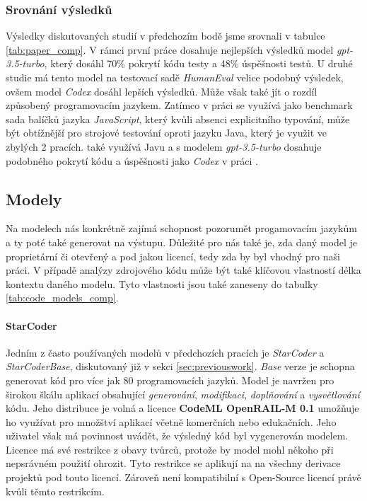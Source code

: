 \documentclass[czech, ma, kiv, he, iso690alph, pdf, viewonly]{fasthesis}
\begin{document}
    \subsubsection{Srovnání výsledků}
    Výsledky diskutovaných studií v předchozím bodě jsme srovnali v tabulce \ref{tab:paper_comp}. V rámci první práce dosahuje nejlepších výsledků model \textit{gpt-3.5-turbo}, který dosáhl 70\% pokrytí kódu testy a 48\% úspěšnosti testů. U druhé studie má tento model na testovací sadě \textit{HumanEval} velice podobný výsledek, ovšem model \textit{Codex} dosáhl lepších výsledků. Může však také jít o rozdíl způsobený programovacím jazykem. Zatímco v práci \cite{schafer2023empirical} se využívá jako benchmark sada balíčků jazyka \textit{JavaScript}, který kvůli absenci explicitního typování, může být obtížnější pro strojové testování oproti jazyku Java, který je využit ve zbylých 2 pracích. \cite{jutai} také využívá Javu a s modelem \textit{gpt-3.5-turbo} dosahuje podobného pokrytí kódu a úspěšnosti jako \textit{Codex} v práci \cite{siddiq2023exploring}.


    \subsection{Modely} \label{sec:research_models}
    Na  modelech nás konkrétně zajímá schopnost pozorumět progamovacím jazykům a ty poté také generovat na výstupu. Důležité pro nás také je, zda daný model je proprietární či otevřený a pod jakou licencí, tedy zda by byl vhodný pro naši práci. V případě analýzy zdrojového kódu může být také klíčovou vlastností délka kontextu daného modelu. Tyto vlastnosti jsou také zaneseny do tabulky \ref{tab:code_models_comp}.

    \paragraph{StarCoder} Jedním z často používaných modelů v předchozích pracích je \textit{StarCoder} a \textit{StarCoderBase}, diskutovaný již v sekci \ref{sec:previouswork}. \textit{Base} verze je schopna generovat kód pro více jak 80 programovacích jazyků. Model je navržen pro širokou škálu aplikací obsahující \textit{generování}, \textit{modifikaci}, \textit{doplňování} a \textit{vysvětlování} kódu. Jeho distribuce je volná a licence \textbf{CodeML OpenRAIL-M 0.1} \cite{BigCode2023} umožňuje ho využívat pro množštví aplikací včetně komerčních nebo edukačních. Jeho uživatel však má povinnost uvádět, že výsledný kód byl vygenerován modelem. Licence má své restrikce z obavy tvůrců, protože by model mohl někoho při nepsrávném použití ohrozit. Tyto restrikce se aplikují na na všechny derivace projektů pod touto licencí. Zároveň není kompatibilní s Open-Source licencí právě kvůli těmto restrikcím.
\end{document}
